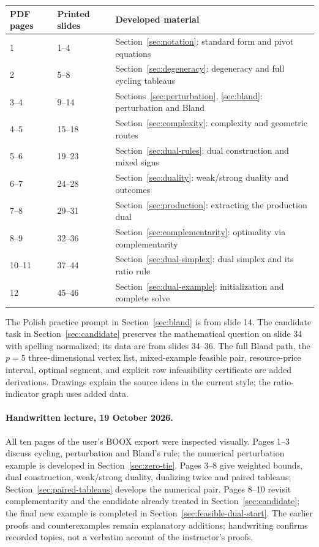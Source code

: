 \documentclass[11pt,a4paper]{article}
\begin{document}
\begin{center}
  \begin{tabular}{lll}\toprule
    PDF pages & Printed slides & Developed material\\\midrule
    1 & 1--4 & Section~\ref{sec:notation}: standard form and pivot equations\\
    2 & 5--8 & Section~\ref{sec:degeneracy}: degeneracy and full cycling tableaus\\
    3--4 & 9--14 & Sections~\ref{sec:perturbation}, \ref{sec:bland}: perturbation and Bland\\
    4--5 & 15--18 & Section~\ref{sec:complexity}: complexity and geometric routes\\
    5--6 & 19--23 & Section~\ref{sec:dual-rules}: dual construction and mixed signs\\
    6--7 & 24--28 & Section~\ref{sec:duality}: weak/strong duality and outcomes\\
    7--8 & 29--31 & Section~\ref{sec:production}: extracting the production dual\\
    8--9 & 32--36 & Section~\ref{sec:complementarity}: optimality via complementarity\\
    10--11 & 37--44 & Section~\ref{sec:dual-simplex}: dual simplex and its ratio rule\\
    12 & 45--46 & Section~\ref{sec:dual-example}: initialization and complete solve\\\bottomrule
  \end{tabular}
\end{center}
The Polish practice prompt in Section~\ref{sec:bland} is from slide 14.
The candidate task in Section~\ref{sec:candidate} preserves the mathematical
question on slide 34 with spelling normalized; its data are from slides 34--36.
The full Bland path, the $p=5$ three-dimensional vertex list, mixed-example
feasible pair, resource-price interval, optimal segment, and explicit row
infeasibility certificate are added derivations. Drawings explain the source
ideas in the current style; the ratio-indicator graph uses added data.

\paragraph{Handwritten lecture, 19 October 2026.}
All ten pages of the user's BOOX export
 were inspected visually.
Pages 1--3 discuss cycling, perturbation and Bland's rule; the numerical
perturbation example is developed in Section~\ref{sec:zero-tie}.
Pages 3--8 give weighted bounds, dual construction, weak/strong duality,
dualizing twice and paired tableaus; Section~\ref{sec:paired-tableaus}
develops the numerical pair. Pages 8--10 revisit complementarity and the
candidate already treated in Section~\ref{sec:candidate}; the final new
example is completed in Section~\ref{sec:feasible-dual-start}.
The earlier proofs and counterexamples remain explanatory additions; handwriting
confirms recorded topics, not a verbatim account of the instructor's proofs.
\end{document}

